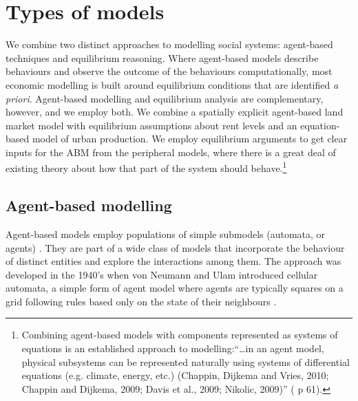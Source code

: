 



\section{Types of models}\label{sec-types}
We combine two distinct approaches to modelling social systems: agent-based techniques and equilibrium reasoning. 
Where agent-based models describe behaviours and observe the outcome of the behaviours computationally, most economic modelling is built around equilibrium conditions that are identified \textit{a priori}. Agent-based modelling and equilibrium analysis are complementary, however, and we employ both. We combine a spatially explicit agent-based land market model with equilibrium assumptions about rent levels and an equation-based model of urban production. We employ equilibrium arguments to get clear inputs for the \gls{ABM} from the peripheral models, where there is a great deal of existing theory about how that part of the system should behave.\footnote{Combining agent-based models with components represented as systems of equations is an established approach to modelling:``\dots in an agent model, physical subsystems can be represented naturally using systems of differential equations (e.g. climate, energy, etc.)  (Chappin, Dijkema and Vries, 2010; Chappin and Dijkema, 2009; Davis et al., 2009; Nikolic, 2009)''  (\cite{chappin_simulating_2011} p 61).} 

\subsection{Agent-based modelling}
Agent-based models employ populations of simple submodels (automata, or agents) \cite{shalizi_methods_2006}. They are part of a wide class of models that incorporate the behaviour of distinct entities and explore the interactions among them. The approach was developed in the 1940's when von Neumann and Ulam introduced cellular automata, a simple form of agent model where agents are typically squares on a grid following rules based only on the state of their neighbours \cite{banksStatisticalChallengesAgentBased2021}.

